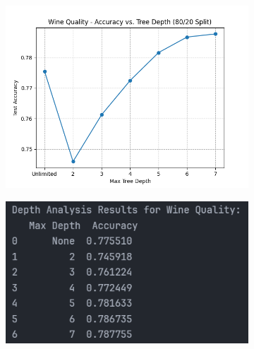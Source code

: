 \begin{figure}[H]
	\centering
	\begin{subfigure}{0.45\textwidth}
		\centering
		\includegraphics[width=\textwidth]{imgs/accuracy_vs_depth_wine_quality.png}
	\end{subfigure}
	\hfill
	\begin{subfigure}{0.45\textwidth}
		\centering
		\includegraphics[width=\textwidth]{imgs/accuracy_vs_depth_wine_quality__analysis.png}
	\end{subfigure}
\end{figure}

